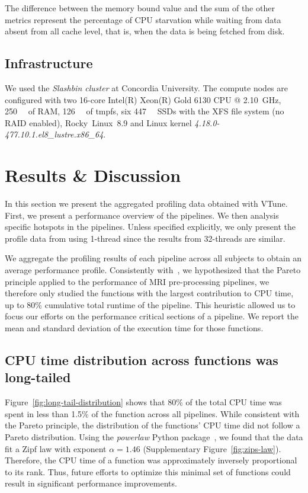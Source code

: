 \documentclass[conference]{IEEEtran}
\begin{document}
The difference between the memory bound value and the sum of the other metrics represent the percentage of CPU starvation while waiting from data absent from all cache level, that is, when the data is being fetched from disk.
			
\subsection{Infrastructure}
We used the \textit{Slashbin cluster} at Concordia University. The compute nodes are configured with two 16-core Intel(R) Xeon(R) Gold 6130 CPU @ \SI{2.10}{\giga\hertz}, \SI{250}{\gibi\byte} of RAM, \SI{126}{\gibi\byte} of tmpfs, six \SI{447}{\gibi\byte} SSDs with the XFS file system (no RAID enabled), Rocky~Linux~8.9 and Linux kernel \textit{4.18.0-477.10.1.el8\_lustre.x86\_64}.
			
\section{Results \& Discussion}
In this section we present the aggregated profiling data obtained with VTune. First, we present a performance overview of the pipelines. We then analysis specific hotspots in the pipelines. Unless specified explicitly, we only present the profile data from using 1-thread since the results from 32-threads are similar.

We aggregate the profiling results of each pipeline across all subjects to obtain an average performance profile. Consistently with~\cite{Kukunas2015-jd}, we hypothesized that the Pareto principle applied to the performance of MRI pre-processing pipelines, we therefore only studied the functions with the largest contribution to CPU time, up to 80\% cumulative total runtime of the pipeline. This heuristic allowed us to focus our efforts on the performance critical sections of a pipeline. We report the mean and standard deviation of the execution time for those functions.
			
\subsection{CPU time distribution across functions was long-tailed}
Figure~\ref{fig:long-tail-distribution} shows that 80\% of the total CPU time was spent in less than 1.5\% of the function across all pipelines. While consistent with the Pareto principle, the distribution of the functions' CPU time did not follow a Pareto distribution. Using the \textit{powerlaw} Python package~\cite{Alstott2014-gr}, we found that the data fit a Zipf law with exponent $\alpha=1.46$ (Supplementary Figure~\ref{fig:zips-law}). Therefore, the CPU time of a function was approximately inversely proportional to its rank. Thus, future efforts to optimize this minimal set of functions could result in significant performance improvements.
\end{document}
